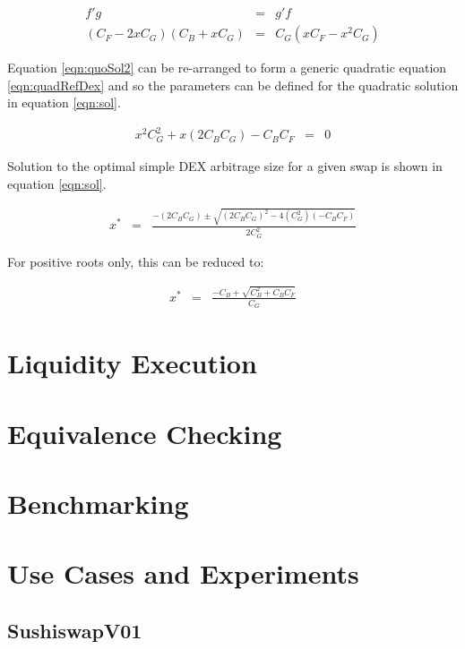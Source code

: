 \documentclass[runningheads]{llncs}
\begin{document}
\begin{eqnarray}
	f'g &=& g'f \label{eqn:quoSolDex}\\
	(C_{F} - 2 x C_{G})(C_{B} + x C_{G}) &=& C_{G} ( x C_{F} - x^2 C_{G}) \label{eqn:quoSol2}
\end{eqnarray}

Equation \ref{eqn:quoSol2} can be re-arranged to form a generic quadratic equation \ref{eqn:quadRefDex} and so the parameters can be defined for the quadratic solution in equation \ref{eqn:sol}.

\begin{eqnarray}
	x^2 C_{G}^2 + x(2 C_{B} C_{G}) - C_{B} C_{F} &=& 0 \label{eqn:quadRefDex}
\end{eqnarray}

Solution to the optimal simple DEX arbitrage size for a given swap is shown in equation \ref{eqn:sol}.

\begin{eqnarray}
	x^* &=& \frac{-(2 C_{B} C_{G}) \pm \sqrt{(2 C_{B} C_{G})^2 - 4(C_{G}^2)(- C_{B} C_{F})}}{2 C_{G}^2} \label{eqn:sol}
\end{eqnarray}

For positive roots only, this can be reduced to:

\begin{eqnarray}
	x^* &=& \frac{- C_{B} + \sqrt{C_{B} ^2 + C_{B} C_{F}}}{C_{G}} \label{eqn:sol2}
\end{eqnarray}

\section{Liquidity Execution}

\section{Equivalence Checking}

\section{Benchmarking}

\section{Use Cases and Experiments}

\subsection{SushiswapV01}
\end{document}
